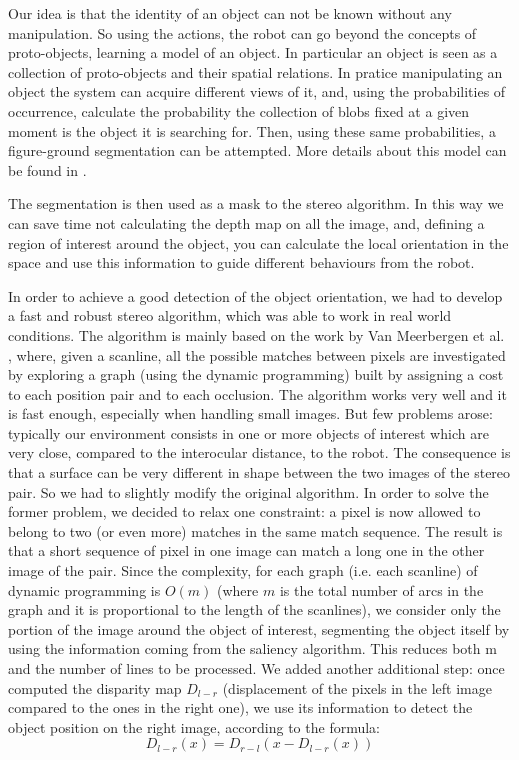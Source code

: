 Our idea is that the identity of an object can not be known without any manipulation. So using the actions, the robot can go beyond the concepts of proto-objects, learning a model of an object. In particular an object is seen as a collection of proto-objects and their spatial relations. In pratice manipulating an object the system can acquire different views of it, and, using the probabilities of occurrence, calculate the probability the collection of blobs fixed at a given moment is the object it is searching for. Then, using these same probabilities, a figure-ground segmentation can be attempted. More details about this model can be found in \cite{orabona05object}.

The segmentation is then used as a mask to the stereo algorithm. In this way we can save time not calculating the depth map on all the image, and, defining a region of interest around the object, you can calculate the local orientation in the space and use this information to guide different behaviours from the robot.

In order to achieve a good detection of the object orientation, we had to develop a fast and robust stereo algorithm, which was able to work in real world conditions.
The algorithm is mainly based on the work by Van Meerbergen et al. \cite{merrbergen02stereo}, where, given a scanline, all the possible matches between pixels are investigated by exploring a graph (using the dynamic programming) built by assigning a cost to each position pair and to each occlusion. The algorithm works very well and it is fast enough, especially when handling small images. But few problems arose: typically our environment consists in one or more objects of interest which are very close, compared to the interocular distance, to the robot. The consequence is that a surface can be very different in shape between the two images of the stereo pair. So we had to slightly modify the original algorithm. In order to solve the former problem, we decided to relax one constraint: a pixel is now allowed to belong to two (or even more) matches in the same match sequence. The result is that a short sequence of pixel in one image can match a long one in the other image of the pair. 
Since the complexity, for each graph (i.e. each scanline) of dynamic programming is $O(m)$ (where $m$ is the total number of arcs in the graph and it is proportional to the length of the scanlines), we consider only the portion of the image around the object of interest, segmenting the object itself by using the information coming from the saliency algorithm. This reduces both m and the number of  lines to be processed.
We added another additional step: once computed the disparity map $D_{l-r}$ (displacement of the pixels in the left image compared to the ones in the right one), we use its information to detect the object position on the right image, according to the formula: 
\begin{equation}D_{l-r}(x)=D_{r-l}(x-D_{l-r}(x))\end{equation}

